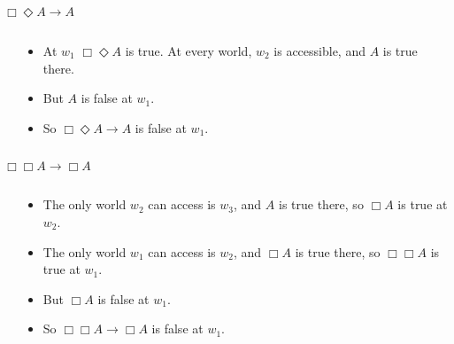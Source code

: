 \documentclass[
  ignorenonframetext,
]{beamer}
\renewcommand{\,}{\text{, }}
\begin{document}
\begin{frame}{\(\Box \Diamond A \rightarrow A\)}
\protect\hypertarget{box-diamond-a-rightarrow-a}{}

\begin{columns}
    \begin{column}{0.45\textwidth}
    \end{column}
    \begin{column}{0.5\textwidth}
    \begin{itemize}
    \item At $w_1$ $\Box \Diamond A$ is true. At every world, $w_2$ is accessible, and $A$ is true there.
    \item But $A$ is false at $w_1$.
    \item So $\Box \Diamond A \rightarrow A$ is false at $w_1$.
    \end{itemize}
  \end{column}
\end{columns}

\end{frame}

\begin{frame}{\(\Box \Box A \rightarrow \Box A\)}
\protect\hypertarget{box-box-a-rightarrow-box-a}{}

\begin{columns}
    \begin{column}{0.45\textwidth}
    \end{column}
    \begin{column}{0.5\textwidth}
    \begin{itemize}
    \item The only world $w_2$ can access is $w_3$, and $A$ is true there, so $\Box A$ is true at $w_2$.
    \item The only world $w_1$ can access is $w_2$, and $\Box A$ is true there, so $\Box \Box A$ is true at $w_1$.
    \item But $\Box A$ is false at $w_1$.
    \item So $\Box \Box A \rightarrow \Box A$ is false at $w_1$.
    \end{itemize}
  \end{column}
\end{columns}

\end{frame}
\end{document}
